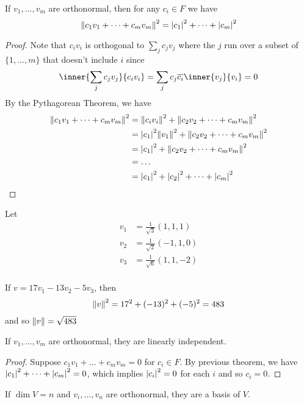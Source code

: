 \documentclass{article}
\begin{document}
    \begin{theorem}
      If $v_1, \ldots, v_m$ are orthonormal, then for any $c_i \in F$ we have \[
        \norm{c_1v_1 + \dots + c_mv_m}^2 = \abs{c_1}^2 + \dots + \abs{c_m}^2
      \]
    \end{theorem}
    \begin{proof}
      Note that $c_iv_i$ is orthogonal to $\sum_j c_jv_j$ where the $j$ run over a subset of $\{1, \ldots, m\}$ that doesn't include $i$ since \[
        \inner{\sum_j c_jv_j}{c_iv_i} = \sum_j c_j\overline{c_i}\inner{v_j}{v_i} = 0
      \]
      By the Pythagorean Theorem, we have
      \begin{align*}
        \norm{c_1v_1 + \dots + c_mv_m}^2 &= \norm{c_iv_i}^2 + \norm{c_2v_2 + \dots + c_mv_m}^2\\
        &= \abs{c_1}^2\norm{v_1}^2 + \norm{c_2v_2 + \dots + c_mv_m}^2\\
        &= \abs{c_1}^2 + \norm{c_2v_2 + \dots + c_mv_m}^2\\
        &= \dots\\
        &= \abs{c_1}^2 + \abs{c_2}^2 + \dots + \abs{c_m}^2\\
      \end{align*}
    \end{proof}
    \begin{example}
      Let
      \begin{align*}
        v_1 &= \frac{1}{\sqrt{3}}(1, 1, 1)\\
        v_2 &= \frac{1}{\sqrt{2}}(-1, 1, 0)\\
        v_3 &= \frac{1}{\sqrt{6}}(1, 1, -2)\\
      \end{align*}

      If $v = 17v_1 -13v_2 -5v_3$, then \[
        \norm{v}^2 = 17^2 + (-13)^2 + (-5)^2 = 483
      \] and so $\norm{v} = \sqrt{483}$
    \end{example}
    \begin{theorem}
      If $v_1, \ldots, v_m$ are orthonormal, they are linearly independent.
    \end{theorem}
    \begin{proof}
      Suppose $c_1v_1 + \dots +c_mv_m = 0$ for $c_i \in F$. By previous theorem, we have $\abs{c_1}^2 + \dots + \abs{c_m}^2 = 0$, which implies $\abs{c_i}^2 = 0$ for each $i$ and so $c_i = 0$.
    \end{proof}
    \begin{theorem}
      If $\dim V = n$ and $v_i, \ldots, v_n$ are orthonormal, they are a basis of $V$.
    \end{theorem}
\end{document}
